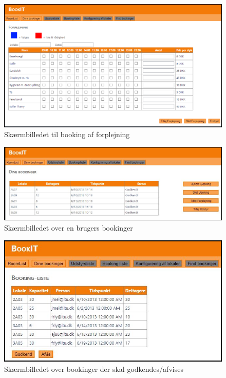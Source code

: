 \begin{figure}[h!]
  \centering
    \includegraphics[angle=90, height=\textheight]{Appendix/GUI-Prototype/DigitalMockup/Forplejning}
  \caption{Skærmbilledet til booking af forplejning}
\label{App_GUI_final_Forplejning}
\end{figure}

\begin{figure}[h!]
  \centering
    \includegraphics[width=\textwidth]{Appendix/GUI-Prototype/DigitalMockup/DineBookinger}
  \caption{Skærmbilledet over en brugers bookinger}
\label{App_GUI_final_DineBookinger}
\end{figure}

\begin{figure}[h!]
  \centering
    \includegraphics[width=\textwidth]{Appendix/GUI-Prototype/DigitalMockup/BookingListe}
  \caption{Skærmbilledet over bookinger der skal godkendes/afvises}
\label{App_GUI_final_BookingListe}
\end{figure}

